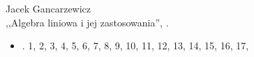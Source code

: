 \begin{center}
  Jacek Gancarzewicz\\
  ,,Algebra liniowa i jej zastosowania'', \cite{Gan04}.
\end{center}

\begin{itemize}
\item[\rmnum1]. 1\cm, 2\cm, 3\cm, 4\cm, 5\cm, 6\cm, 7\cm, 8\cm, 9\cm,
  10\cm, 11\cm, 12\cm, 13\cm, 14\cm, 15\cm, 16\cm, 17\cm,
\end{itemize}





